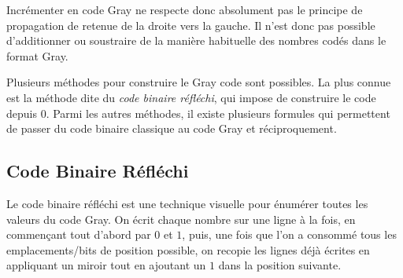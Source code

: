 \documentclass[11pt,a4paper]{article}
\begin{document}
Incrémenter en code Gray ne respecte donc absolument pas le principe de propagation de retenue de la droite vers la gauche.
Il n'est donc pas possible d'additionner ou soustraire de la manière habituelle des nombres codés dans le format Gray.

\bigskip

Plusieurs méthodes pour \og construire \fg{} le Gray code sont possibles.
La plus connue est la méthode dite du \textit{code binaire réfléchi}, qui impose de construire le code depuis $ 0 $.
Parmi les autres méthodes, il existe plusieurs formules qui permettent de passer du code binaire classique au code Gray et réciproquement.


\clearpage


\subsection{Code Binaire Réfléchi}

Le code binaire réfléchi est une technique visuelle pour énumérer toutes les valeurs du code Gray.
On écrit chaque nombre sur une ligne à la fois, en commençant tout d'abord par $ 0 $ et $ 1 $, puis, une fois que l'on a consommé tous les emplacements/bits de position possible, on recopie les lignes déjà écrites en appliquant un miroir tout en ajoutant un $ 1 $ dans la position suivante.
\end{document}
